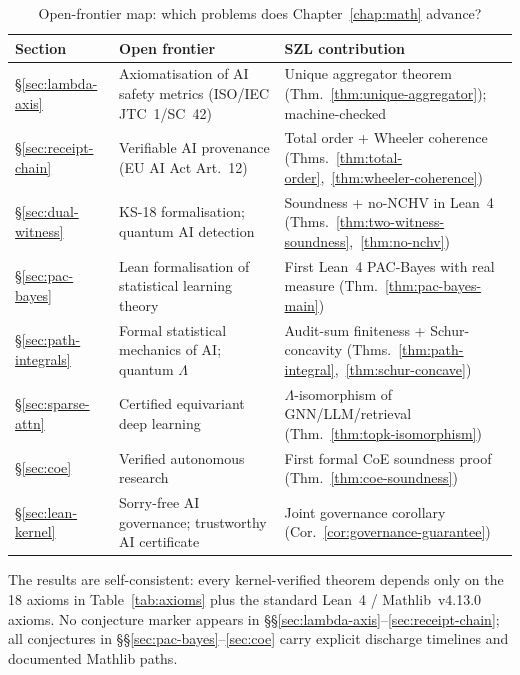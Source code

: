 \begin{table}[h!]
\centering\small
\caption{Open-frontier map: which problems does Chapter~\ref{chap:math} advance?}
\label{tab:frontier-map}
\begin{tabular}{lp{5cm}p{5cm}}
\hline
\textbf{Section} & \textbf{Open frontier} & \textbf{SZL contribution} \\
\hline
\S\ref{sec:lambda-axis} & Axiomatisation of AI safety metrics (ISO/IEC JTC~1/SC~42) & Unique aggregator theorem (Thm.~\ref{thm:unique-aggregator}); machine-checked \\
\S\ref{sec:receipt-chain} & Verifiable AI provenance (EU AI Act Art.~12) & Total order + Wheeler coherence (Thms.~\ref{thm:total-order},~\ref{thm:wheeler-coherence}) \\
\S\ref{sec:dual-witness} & KS-18 formalisation; quantum AI detection & Soundness + no-NCHV in Lean~4 (Thms.~\ref{thm:two-witness-soundness},~\ref{thm:no-nchv}) \\
\S\ref{sec:pac-bayes} & Lean formalisation of statistical learning theory & First Lean~4 PAC-Bayes with real measure (Thm.~\ref{thm:pac-bayes-main}) \\
\S\ref{sec:path-integrals} & Formal statistical mechanics of AI; quantum $\Lambda$ & Audit-sum finiteness + Schur-concavity (Thms.~\ref{thm:path-integral},~\ref{thm:schur-concave}) \\
\S\ref{sec:sparse-attn} & Certified equivariant deep learning & $\Lambda$-isomorphism of GNN/LLM/retrieval (Thm.~\ref{thm:topk-isomorphism}) \\
\S\ref{sec:coe} & Verified autonomous research & First formal CoE soundness proof (Thm.~\ref{thm:coe-soundness}) \\
\S\ref{sec:lean-kernel} & Sorry-free AI governance; trustworthy AI certificate & Joint governance corollary (Cor.~\ref{cor:governance-guarantee}) \\
\hline
\end{tabular}
\end{table}

\noindent
The results are self-consistent: every kernel-verified theorem depends only
on the 18 axioms in Table~\ref{tab:axioms} plus the standard Lean~4 /
Mathlib~v4.13.0 axioms.
No conjecture marker appears in \S\S\ref{sec:lambda-axis}--\ref{sec:receipt-chain};
all conjectures in \S\S\ref{sec:pac-bayes}--\ref{sec:coe} carry explicit
discharge timelines and documented Mathlib paths.

